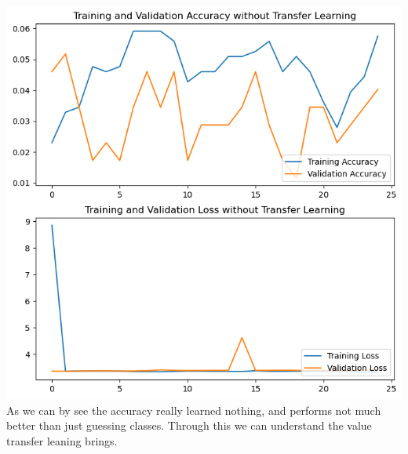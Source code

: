 \documentclass[12pt]{article}
\begin{document}
\includegraphics*[scale=0.5]{images/loss+acc no tf.png}\\
As we can by see the accuracy really learned nothing, and performs not much better than just guessing classes. Through this we can understand the value transfer leaning brings.
\\
\end{document}
